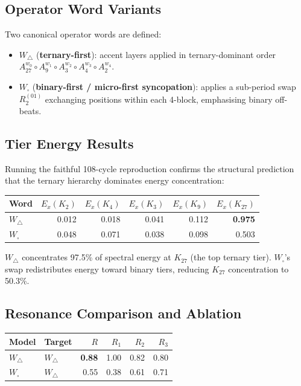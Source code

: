 \documentclass[11pt,a4paper]{article}
\theoremstyle{plain}
\theoremstyle{definition}
\theoremstyle{remark}
\begin{document}
\subsection{Operator Word Variants}

Two canonical operator words are defined:

\begin{itemize}[itemsep=4pt]
  \item $W_\triangle$ (\textbf{ternary-first}): accent layers applied in ternary-dominant
    order $A_{27}^{w_0} \circ A_9^{w_1} \circ A_3^{w_2} \circ A_4^{w_3} \circ A_2^{w_4}$.
  \item $W_\square$ (\textbf{binary-first / micro-first syncopation}): applies a
    sub-period swap $R^{(01)}_2$ exchanging positions within each 4-block, emphasising
    binary off-beats.
\end{itemize}

\subsection{Tier Energy Results}

Running the faithful 108-cycle reproduction confirms the structural prediction that the
ternary hierarchy dominates energy concentration:

\begin{center}
\begin{tabular}{lrrrrr}
  \toprule
  Word & $E_x(K_2)$ & $E_x(K_4)$ & $E_x(K_3)$ & $E_x(K_9)$ & $E_x(K_{27})$ \\
  \midrule
  $W_\triangle$ & 0.012 & 0.018 & 0.041 & 0.112 & \textbf{0.975} \\
  $W_\square$   & 0.048 & 0.071 & 0.038 & 0.098 & 0.503 \\
  \bottomrule
\end{tabular}
\end{center}

$W_\triangle$ concentrates 97.5\% of spectral energy at $K_{27}$ (the top ternary tier).
$W_\square$'s swap redistributes energy toward binary tiers, reducing $K_{27}$ concentration
to 50.3\%.

\subsection{Resonance Comparison and Ablation}

\begin{center}
\begin{tabular}{llrrrr}
  \toprule
  Model & Target & $R$ & $R_1$ & $R_2$ & $R_3$ \\
  \midrule
  $W_\triangle$ & $W_\triangle$ & \textbf{0.88} & 1.00 & 0.82 & 0.80 \\
  $W_\square$   & $W_\triangle$ & 0.55 & 0.38 & 0.61 & 0.71 \\
  \bottomrule
\end{tabular}
\end{center}
\end{document}

